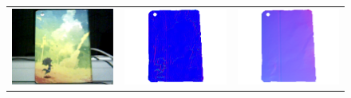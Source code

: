 \begin{figure}[!ht]
\centering
\setlength{\tabcolsep}{0.1em} %
 {\renewcommand{\arraystretch}{1.6}%
\begin{tabular}{c|c c}
   \includegraphics[height = 0.24\linewidth]{figures/result/robust_padback_rgb.pdf} 
   &
   \includegraphics[height = 0.24\linewidth]{figures/result/rgbd_padback_normal.pdf} &
   \includegraphics[height = 0.24\linewidth]{figures/result/robust_padback_normal.pdf} \\


\end{tabular}}
\end{figure}
